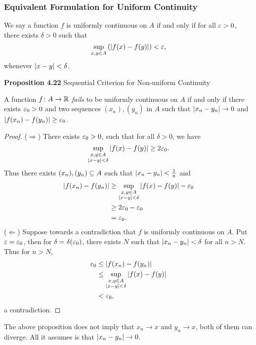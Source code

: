 \documentclass[class=article, crop=false]{standalone}
\begin{document}
  \subsubsection{Equivalent Formulation for Uniform Continuity}
  We say a function $f$ is uniformly continuous on $A$ if and only if for all $\varepsilon > 0$, there exists $\delta > 0$ such that
  \[
    \sup_{x,y\in A} \left( \left\lvert f(x) - f(y) \right\rvert \right) < \varepsilon,
  \]
  whenever $\left\lvert x - y \right\rvert < \delta$. \par
  \textbf{Proposition 4.22} Sequential Criterion for Non-uniform Continuity \par
  A function $f\colon  A\to \mathbb{R}$ \emph{fails} to be uniformly continuous on $A$ if and only if there exists $\varepsilon_0 > 0$ and two sequences $(x_n), (y_n)$ in $A$ such that $\left\lvert x_n - y_n \right\rvert\to 0$ and $\left\lvert f(x_n) - f(y_n) \right\rvert \geq \varepsilon_0$.
  \begin{proof}
    ($\Rightarrow$) There exists $\varepsilon_0 > 0$, such that for all $\delta > 0$, we have
    \[
      \sup_{\substack{x,y\in A\\ \left\lvert x-y \right\rvert < \delta}} \left\lvert f(x) - f(y) \right\rvert\geq 2\varepsilon_0.
    \]
    Thus there exists $(x_n), (y_n)\subseteq A$ such that $\left\lvert x_n - y_n \right\rvert < \frac{1}{n}$ and
    \begin{align*}
      \left\lvert f(x_n) - f(y_n) \right\rvert &\geq \sup_{\substack{x,y\in A \\ \left\lvert x - y \right\rvert < \delta}} \left\lvert f(x) - f(y) \right\rvert - \varepsilon_0 \\
                            &\geq 2\varepsilon_0 - \varepsilon_0 \\
                            &= \varepsilon_0.
    \end{align*}
    ($\Leftarrow$) Suppose towards a contradiction that $f$ is uniformly continuous on $A$. Put $\varepsilon = \varepsilon_0$, then for $\delta = \delta(\varepsilon_0)$, there exists $N$ such that $\left\lvert x_n - y_n \right\rvert < \delta$ for all $n > N$. Thus for $n > N$,
    \begin{align*}
      \varepsilon_0 &\leq \left\lvert f(x_n) - f(y_n) \right\rvert \\
             &\leq \sup_{\substack{x,y\in A \\ \left\lvert x- y \right\rvert < \delta}} \left\lvert f(x) - f(y) \right\rvert \\
             &< \varepsilon_0,
    \end{align*}
    a contradiction.
  \end{proof}
  \begin{note}{}
    The above proposition does not imply that $x_n\to x$ and $y_n\to x$, both of them can diverge. All it assumes is that $\left\lvert x_n - y_n \right\rvert\to 0$.
  \end{note}
\end{document}
